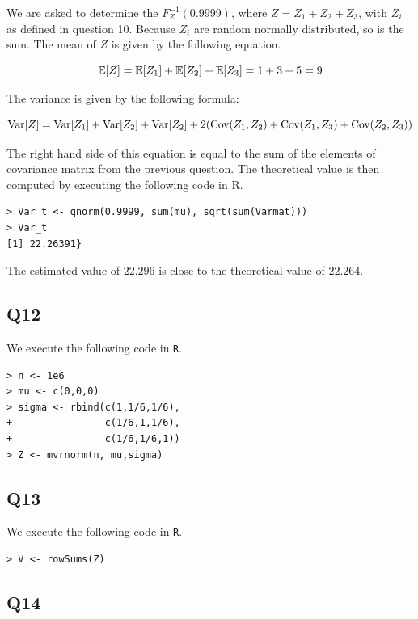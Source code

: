 We are asked to determine the $F^{-1}_{Z}(0.9999)$, where $Z = Z_1 + Z_2 + Z_3$, with $Z_i$ as defined in question 10. Because $Z_i$ are random normally distributed, so is the sum. The mean of $Z$ is given by the following equation.

\begin{displaymath}
\operatorname{\mathbb{E}}[Z] = \operatorname{\mathbb{E}}[Z_1] + \operatorname{\mathbb{E}}[Z_2] + \operatorname{\mathbb{E}}[Z_3] = 1 + 3 + 5 = 9
\end{displaymath}

The variance is given by the following formula:

\begin{displaymath}
\operatorname{\text{Var}}[Z] = \operatorname{\text{Var}}[Z_1] + \operatorname{\text{Var}}[Z_2] + \operatorname{\text{Var}}[Z_2] + 2 (\operatorname{\text{Cov}}(Z_1,Z_2) + \operatorname{\text{Cov}}(Z_1,Z_3) + \operatorname{\text{Cov}}(Z_2,Z_3))
\end{displaymath}

The right hand side of this equation is equal to the sum of the elements of covariance matrix from the previous question. The theoretical value is then computed by executing the following code in R.

\begin{verbatim}
> Var_t <- qnorm(0.9999, sum(mu), sqrt(sum(Varmat)))
> Var_t
[1] 22.26391}
\end{verbatim}

The estimated value of $22.296$ is close to the theoretical value of $22.264$.

\subsection*{Q12}

We execute the following code in \verb|R|.

\begin{verbatim}
> n <- 1e6
> mu <- c(0,0,0)
> sigma <- rbind(c(1,1/6,1/6),
+                c(1/6,1,1/6),
+                c(1/6,1/6,1))
> Z <- mvrnorm(n, mu,sigma)
\end{verbatim}

\subsection*{Q13}

We execute the following code in \verb|R|.

\begin{verbatim}
> V <- rowSums(Z)
\end{verbatim}

\subsection*{Q14}

